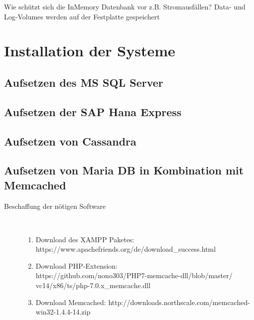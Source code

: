 \documentclass[a4paper, 12pt]{scrartcl}
\begin{document}
Wie schützt sich die InMemory Datenbank vor z.B. Stromausfällen?
Data- und Log-Volumes werden auf der Festplatte gespeichert


\newpage

\section{Installation der Systeme}
\subsection{Aufsetzen des MS SQL Server}
\subsection{Aufsetzen der SAP Hana Express}
\subsection{Aufsetzen von Cassandra}
\subsection{Aufsetzen von Maria DB in Kombination mit Memcached}

\begin{description}
   \item[Beschaffung der nötigen Software]~\par
   \begin{enumerate}
      \item Download des XAMPP Paketes: \\https://www.apachefriends.org/de/download_success.html
      \item Download PHP-Extension: \\https://github.com/nono303/PHP7-memcache-dll/blob/master/\\vc14/x86/ts/php-7.0.x_memcache.dll
      \item Download Memcached: http://downloads.northscale.com/memcached-win32-1.4.4-14.zip
   \end{enumerate}  
  
\end{description}
\end{document}
